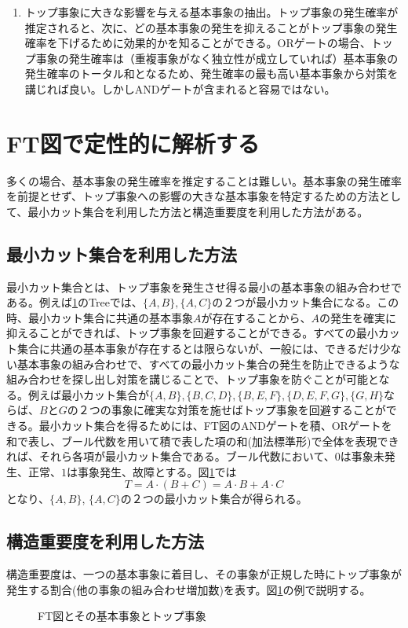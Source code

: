 \begin{enumerate}
\item トップ事象に大きな影響を与える基本事象の抽出。トップ事象の発生確率が推定されると、次に、どの基本事象の発生を抑えることがトップ事象の発生確率を下げるために効果的かを知ることができる。ORゲートの場合、トップ事象の発生確率は（重複事象がなく独立性が成立していれば）基本事象の発生確率のトータル和となるため、発生確率の最も高い基本事象から対策を講じれば良い。しかしANDゲートが含まれると容易ではない。
\end{enumerate}
\section{FT図で定性的に解析する}
多くの場合、基本事象の発生確率を推定することは難しい。基本事象の発生確率を前提とせず、トップ事象への影響の大きな基本事象を特定するための方法として、最小カット集合を利用した方法と構造重要度を利用した方法がある。
\subsection{最小カット集合を利用した方法}
最小カット集合とは、トップ事象を発生させ得る最小の基本事象の組み合わせである。例えば\ref{422}のTreeでは、$\{A,B\}, \{A,C\}$の２つが最小カット集合になる。この時、最小カット集合に共通の基本事象$A$が存在することから、$A$の発生を確実に抑えることができれば、トップ事象を回避することができる。すべての最小カット集合に共通の基本事象が存在するとは限らないが、一般には、できるだけ少ない基本事象の組み合わせで、すべての最小カット集合の発生を防止できるような組み合わせを探し出し対策を講じることで、トップ事象を防ぐことが可能となる。例えば最小カット集合が$\{A,B\},\{B,C,D\},\{B,E,F\},\{D,E,F,G\},\{G,H\}$ならば、$B$と$G$の２つの事象に確実な対策を施せばトップ事象を回避することができる。最小カット集合を得るためには、FT図のANDゲートを積、ORゲートを和で表し、ブール代数を用いて積で表した項の和(加法標準形)で全体を表現できれば、それら各項が最小カット集合である。ブール代数において、$0$は事象未発生、正常、$1$は事象発生、故障とする。図\ref{422}では
\[T=A\cdot (B+C) = A\cdot B + A \cdot C\]
となり、$\{A,B\}$, $\{A,C\}$の２つの最小カット集合が得られる。
\subsection{構造重要度を利用した方法}
構造重要度は、一つの基本事象に着目し、その事象が正規した時にトップ事象が発生する割合(他の事象の組み合わせ増加数)を表す。図\ref{422}の例で説明する。
\begin{figure}[htbp]
\begin{center}
\end{center}
\caption{FT図とその基本事象とトップ事象}
\label{422}
\end{figure}
\renewcommand{\labelenumi}{(\roman{enumi})}

